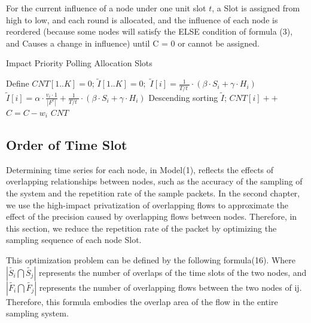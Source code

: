 \documentclass[conference,compsoc]{IEEEtran}
\begin{document}
For the current influence of a node under one unit slot $t$, a Slot is assigned from high to low, and each round is allocated, and the influence of each node is reordered (because some nodes will satisfy the ELSE condition of formula (3), and Causes a change in influence) until C = 0 or cannot be assigned.
\begin{algorithm}[h]
\caption{Impact Priority Polling Allocation Slots}
\begin{algorithmic}[1]
\STATE Define $CNT[1..K] = 0$;   $\widetilde{I}[1..K] = 0;$
\STATE  $ \widetilde{I}[i]  = \frac{1}{{T}/{t}\;}\cdot (\beta \cdot {{S}_{i}}+\gamma \cdot {{H}_{i}})$ 
\ELSE 
\STATE  $ \widetilde{I}[i]  = \alpha \cdot \frac{{{v}_{i}\cdot 1}}{\left| {{F}^{c}} \right|}+\frac{1}{{T}/{t}\;} \cdot (\beta \cdot {{S}_{i}}+\gamma \cdot {{H}_{i}})$
\ENDIF
\ENDFOR
\STATE Descending sorting $ \widetilde{I}  $;
\STATE $CNT[i]++$
\STATE $C = C - w_i $
\ENDIF
\ENDFOR
\ENDWHILE
\RETURN $CNT$
\label{code:recentEnd}
\end{algorithmic}
\end{algorithm}


\subsection{Order of Time Slot}

Determining time series for each node, in Model(1), reflects the effects of overlapping relationships between nodes, such as the accuracy of the sampling of the system and the repetition rate of the sample packets. In the second chapter, we use the high-impact privatization of overlapping flows to approximate the effect of the precision caused by overlapping flows between nodes. Therefore, in this section, we reduce the repetition rate of the packet by optimizing the sampling sequence of each node Slot.

This optimization problem can be defined by the following formula(16). Where $ \left| \widetilde{{{S}_{i}}}\bigcap \widetilde{{{S}_{j}}} \right| $ represents the number of overlaps of the time slots of the two nodes, and $\left| \widetilde{{{F}_{i}}}\bigcap \widetilde{{{F}_{j}}} \right|$ represents the number of overlapping flows between the two nodes of ij. Therefore, this formula embodies the overlap area of the flow in the entire sampling system.
\end{document}
